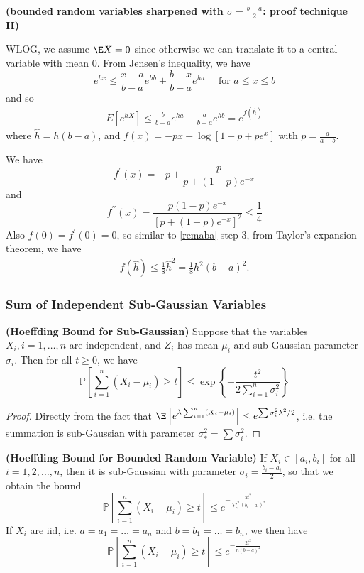 \documentclass{article}
\newcommand{\bfs}[1]{\textbf{({#1})}}
\begin{document}
\begin{rema}{\bfs{bounded random variables sharpened with  $\sigma=\frac{b-a}{2}$: proof technique II}}\label{remaba2}

WLOG, we assume $\E X = 0$ since otherwise we can translate it to a central variable  with mean $0$. From Jensen's inequality, we have 
$$
e^{h x} \leq \frac{x-a}{b-a} e^{h b}+\frac{b-x}{b-a} e^{h a} \quad \text { for } a \leq x \leq b
$$
and so
\begin{align}
    E \left[ e ^{ h X }\right] \leq \frac{ b }{ b - a } e ^{ ha }-\frac{ a }{ b - a } e ^{ hb } = e ^{ f ( \hat{h} )}
\end{align}
where $\hat{ h }= h ( b - a )$, and $f ( x )=- px +\log \left[1- p + pe ^{ x }\right]$ with $p=\frac{a}{a-b}$.

We have
$$
f^{\prime}(x)=-p+\frac{p}{p+(1-p) e^{-x}}
$$
and
$$
f ^{\prime \prime}( x )=\frac{ p (1- p ) e ^{- x }}{\left[ p +(1- p ) e ^{- x }\right]^{2}} \leq \frac{1}{4}
$$
Also $f (0)= f ^{\prime}(0)=0$, so similar to \cref{remaba} step 3, from Taylor’s expansion theorem, we have
\begin{align*}
f(\hat{ h }) \leq \frac{1}{8} \hat{ h }^{2}=\frac{1}{8} h ^{2}( b - a )^{2} .
\end{align*}
\end{rema}
\subsubsection{Sum of Independent Sub-Gaussian Variables}
\begin{thma}{\bfs{Hoeffding Bound for  Sub-Gaussian}}\label{thmhoegaussian}
Suppose that the variables $X_{i}, i=1, \ldots, n$ are independent, and $Z_{i}$ has mean $\mu_{i}$ and sub-Gaussian parameter $\sigma_{i}$. Then for all $t \geq 0$, we have
$$
\mathbb{P}\left[\sum_{i=1}^{n}\left(X_{i}-\mu_{i}\right) \geq t\right] \leq \exp \left\{-\frac{t^{2}}{2 \sum_{i=1}^{n} \sigma_{i}^{2}}\right\}
$$
\end{thma} 
\begin{proof}
Directly from the fact that $\E \left[e^{\lambda\sum_{i=1}^{n}\left(X_{i}-\mu_{i}\right)}\right]\le e^{\sum \sigma_i^2\lambda^2/2}$, i.e. the summation is sub-Gaussian with parameter $\sigma_*^2 = \sum \sigma^2_i$.
\end{proof}
\begin{cora}{\bfs{Hoeffding Bound for Bounded Random Variable}}\label{corhoeffbound}
If $X_{i} \in[a_i, b_i]$ for all $i=1,2, \ldots, n$, then  it is sub-Gaussian with parameter  $\sigma_i=\frac{b_i-a_i}{2}$, so that we obtain the bound
$$
\mathbb{P}\left[\sum_{i=1}^{n}\left(X_{i}-\mu_{i}\right) \geq t\right] \leq e^{-\frac{2 t^{2}}{\sum_{i}^n(b_i-a_i)^{2}}}
$$
If $X_{i}$ are \gls{iid}, i.e. $a=a_1=\ldots=a_n$ and $b=b_1=\ldots=b_n$, we then have
$$
\mathbb{P}\left[\sum_{i=1}^{n}\left(X_{i}-\mu_{i}\right) \geq t\right] \leq e^{-\frac{2 t^{2}}{n(b-a)^{2}}}
$$
\end{cora}
\end{document}
